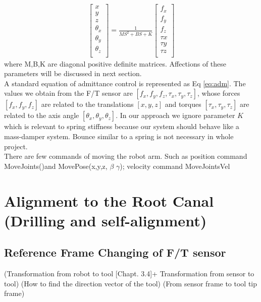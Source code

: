 \begin{equation}
\label{eq:adm}
\begin{split}
\begin{bmatrix}
x \\
y \\
z \\
\theta _x \\
\theta _y \\
\theta _z \\
\end{bmatrix}
=
\frac{1}{MS^2+BS+K}
\begin{bmatrix}
f_x \\
f_y \\
f_z \\
\tau x \\
\tau y \\
\tau z \\
\end{bmatrix}
\end{split}
\end{equation}
where M,B,K are diagonal positive definite matrices. Affections of these parameters will be discussed in next section. \\
A standard equation of admittance control is represented as Eq \ref{eq:adm}. The values we obtain from the F/T sensor are $\left[f_x, f_y, f_z,\tau _x, \tau _y, \tau _z \right]$, whose forces $ \left[f_x, f_y, f_z\right]$ are related to the translations $ \left[x, y, z\right]$ and torques $ \left[\tau _x, \tau _y, \tau _z\right]$ are related to the axis angle $ \left[\theta _x,\theta _y,\theta _z\right]$. In our approach we ignore parameter $K$ which is relevant to spring stiffness because our system should behave like a mass-damper system. Bounce similar to a spring is not necessary in whole project. \\
There are few commands of moving the robot arm. Such as position command MoveJoints()and MovePose(x,y,z,\text{$\alpha$} $\beta$ $\gamma$); velocity command MoveJointsVel\\
\section{Alignment to the Root Canal (Drilling and self-alignment)}
\subsection{Reference Frame Changing of F/T sensor}
\label{sec:rfc}
(Transformation from robot to tool [Chapt. 3.4]+ Transformation from sensor to tool) 
(How to find the direction vector of the tool)
(From sensor frame to tool tip frame)
